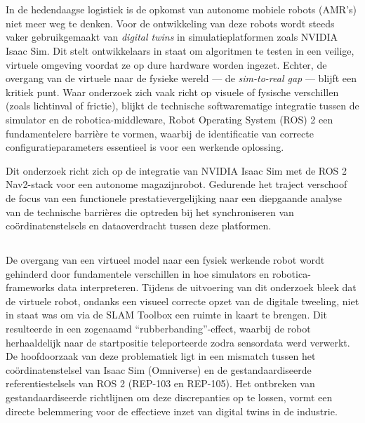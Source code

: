 
\chapter{}%
\label{ch:inleiding}

In de hedendaagse logistiek is de opkomst van autonome mobiele robots (AMR's) niet meer weg te denken. Voor de ontwikkeling van deze robots wordt steeds vaker gebruikgemaakt van \textit{digital twins} in simulatieplatformen zoals NVIDIA Isaac Sim. Dit stelt ontwikkelaars in staat om algoritmen te testen in een veilige, virtuele omgeving voordat ze op dure hardware worden ingezet. Echter, de overgang van de virtuele naar de fysieke wereld — de \textit{sim-to-real gap} — blijft een kritiek punt. Waar onderzoek zich vaak richt op visuele of fysische verschillen (zoals lichtinval of frictie), blijkt de technische softwarematige integratie tussen de simulator en de robotica-middleware, Robot Operating System (ROS) 2 een fundamentelere barrière te vormen, waarbij de identificatie van correcte configuratieparameters essentieel is voor een werkende oplossing.

Dit onderzoek richt zich op de integratie van NVIDIA Isaac Sim met de ROS 2 Nav2-stack voor een autonome magazijnrobot. Gedurende het traject verschoof de focus van een functionele prestatievergelijking naar een diepgaande analyse van de technische barrières die optreden bij het synchroniseren van coördinatenstelsels en dataoverdracht tussen deze platformen.

\section{}%
\label{sec:probleemstelling}

De overgang van een virtueel model naar een fysiek werkende robot wordt gehinderd door fundamentele verschillen in hoe simulators en robotica-frameworks data interpreteren. Tijdens de uitvoering van dit onderzoek bleek dat de virtuele robot, ondanks een visueel correcte opzet van de digitale tweeling, niet in staat was om via de SLAM Toolbox een ruimte in kaart te brengen. Dit resulteerde in een zogenaamd ``rubberbanding''-effect, waarbij de robot herhaaldelijk naar de startpositie teleporteerde zodra sensordata werd verwerkt. De hoofdoorzaak van deze problematiek ligt in een mismatch tussen het coördinatenstelsel van Isaac Sim (Omniverse) en de gestandaardiseerde referentiestelsels van ROS 2 (REP-103 en REP-105). Het ontbreken van gestandaardiseerde richtlijnen om deze discrepanties op te lossen, vormt een directe belemmering voor de effectieve inzet van digital twins in de industrie.

